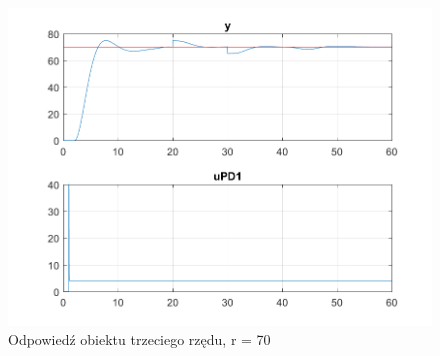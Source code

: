 \begin{figure}[h!]
	\centering
	\includegraphics[scale = 0.8]{fig/Z1_New_Signal_1/fig1_3_70.png}
	\caption		
	{Odpowiedź obiektu trzeciego rzędu, r = 70}
	\label{wykres_4}
\end{figure}

